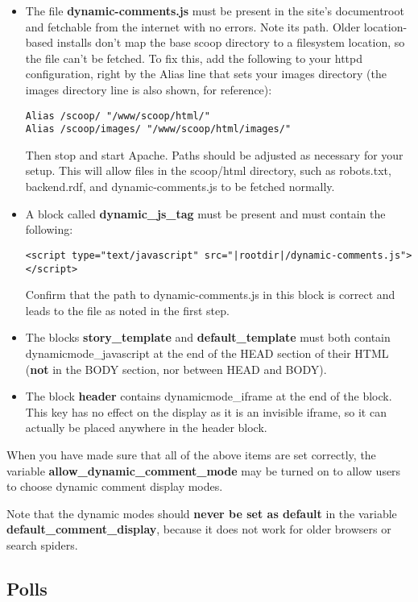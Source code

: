 \begin{itemize}
\item The file {\bf dynamic-comments.js} must be present in the site's documentroot and fetchable from the internet with no errors.  Note its path.  Older location-based installs don't map the base scoop directory to a filesystem location, so the file can't be fetched.  To fix this, add the following to your httpd configuration, right by the Alias line that sets your images directory (the images directory line is also shown, for reference):
\begin{verbatim}
Alias /scoop/ "/www/scoop/html/"
Alias /scoop/images/ "/www/scoop/html/images/"
\end{verbatim}
Then stop and start Apache.  Paths should be adjusted as necessary for your setup.  This will allow files in the scoop/html directory, such as robots.txt, backend.rdf, and dynamic-comments.js to be fetched normally.
\item A block called {\bf dynamic\_js\_tag} must be present and must contain the following:
\begin{verbatim}
<script type="text/javascript" src="|rootdir|/dynamic-comments.js"></script>
\end{verbatim}
Confirm that the path to dynamic-comments.js in this block is correct and leads to the file as noted in the first step.
\item The blocks {\bf story\_template} and {\bf default\_template} must both contain \latexhtml{$\vert$}{|}dynamicmode\_javascript\latexhtml{$\vert$}{|} at the end of the HEAD section of their HTML ({\bf not} in the BODY section, nor between HEAD and BODY).
\item The block {\bf header} contains \latexhtml{$\vert$}{|}dynamicmode\_iframe\latexhtml{$\vert$}{|} at the end of the block.  This key has no effect on the display as it is an invisible iframe, so it can actually be placed anywhere in the header block.
\end{itemize}

When you have made sure that all of the above items are set correctly, the variable {\bf allow\_dynamic\_comment\_mode} may be turned on to allow users to choose dynamic comment display modes.

Note that the dynamic modes should {\bf never be set as default} in the variable {\bf default\_comment\_display}, because it does not work for older browsers or search spiders.

\subsection{Polls}
\label{features-polls}

